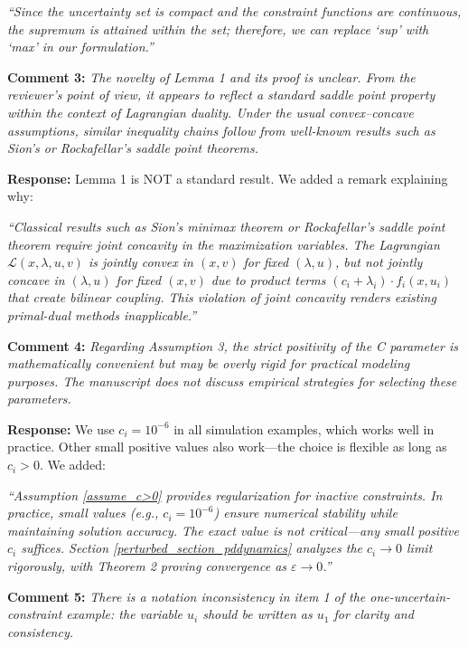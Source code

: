 \documentclass[journal,twoside,web]{ieeecolor}
\begin{document}
{\color{revisionblue}\textit{``Since the uncertainty set is compact and the constraint functions are continuous, the supremum is attained within the set; therefore, we can replace `sup' with `max' in our formulation.''}}

\vspace{0.5em}
\noindent\textbf{Comment 3:} \textit{The novelty of Lemma 1 and its proof is unclear. From the reviewer's point of view, it appears to reflect a standard saddle point property within the context of Lagrangian duality. Under the usual convex--concave assumptions, similar inequality chains follow from well-known results such as Sion's or Rockafellar's saddle point theorems.}

\noindent\textbf{Response:} Lemma 1 is NOT a standard result. We added a remark explaining why:

{\color{revisionblue}\textit{``Classical results such as Sion's minimax theorem or Rockafellar's saddle point theorem require joint concavity in the maximization variables. The Lagrangian $\mathcal{L}(x,\lambda,u,v)$ is jointly convex in $(x,v)$ for fixed $(\lambda,u)$, but not jointly concave in $(\lambda,u)$ for fixed $(x,v)$ due to product terms $(c_i+\lambda_i) \cdot f_i(x,u_i)$ that create bilinear coupling. This violation of joint concavity renders existing primal-dual methods inapplicable.''}}

\vspace{0.5em}
\noindent\textbf{Comment 4:} \textit{Regarding Assumption 3, the strict positivity of the C parameter is mathematically convenient but may be overly rigid for practical modeling purposes. The manuscript does not discuss empirical strategies for selecting these parameters.}

\noindent\textbf{Response:} We use $c_i = 10^{-6}$ in all simulation examples, which works well in practice. Other small positive values also work---the choice is flexible as long as $c_i > 0$. We added:

{\color{revisionblue}\textit{``Assumption \ref{assume_c>0} provides regularization for inactive constraints. In practice, small values (e.g., $c_i = 10^{-6}$) ensure numerical stability while maintaining solution accuracy. The exact value is not critical---any small positive $c_i$ suffices. Section \ref{perturbed_section_pddynamics} analyzes the $c_i \to 0$ limit rigorously, with Theorem 2 proving convergence as $\varepsilon \to 0$.''}}

\vspace{0.5em}
\noindent\textbf{Comment 5:} \textit{There is a notation inconsistency in item 1 of the one-uncertain-constraint example: the variable $u_i$ should be written as $u_1$ for clarity and consistency.}
\end{document}
